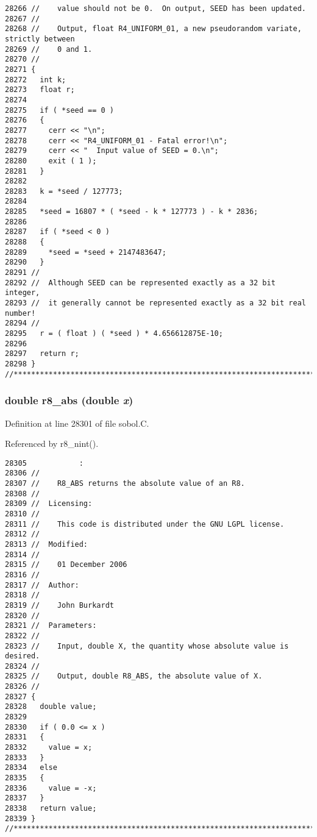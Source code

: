 \begin{Code}
\begin{verbatim}
28266 //    value should not be 0.  On output, SEED has been updated.
28267 //
28268 //    Output, float R4_UNIFORM_01, a new pseudorandom variate, strictly between
28269 //    0 and 1.
28270 //
28271 {
28272   int k;
28273   float r;
28274 
28275   if ( *seed == 0 )
28276   {
28277     cerr << "\n";
28278     cerr << "R4_UNIFORM_01 - Fatal error!\n";
28279     cerr << "  Input value of SEED = 0.\n";
28280     exit ( 1 );
28281   }
28282 
28283   k = *seed / 127773;
28284 
28285   *seed = 16807 * ( *seed - k * 127773 ) - k * 2836;
28286 
28287   if ( *seed < 0 )
28288   {
28289     *seed = *seed + 2147483647;
28290   }
28291 //
28292 //  Although SEED can be represented exactly as a 32 bit integer,
28293 //  it generally cannot be represented exactly as a 32 bit real number!
28294 //
28295   r = ( float ) ( *seed ) * 4.656612875E-10;
28296 
28297   return r;
28298 }
//****************************************************************************80
\end{verbatim}
\end{Code}


\subsubsection{\setlength{\rightskip}{0pt plus 5cm}double r8\_\-abs (double {\em x})}\label{sobol_8C_764d529be849adbbb2865d6c886710dc}




Definition at line 28301 of file sobol.C.

Referenced by r8\_\-nint().

\begin{Code}\begin{verbatim}28305            :
28306 //
28307 //    R8_ABS returns the absolute value of an R8.
28308 //
28309 //  Licensing:
28310 //
28311 //    This code is distributed under the GNU LGPL license. 
28312 //
28313 //  Modified:
28314 //
28315 //    01 December 2006
28316 //
28317 //  Author:
28318 //
28319 //    John Burkardt
28320 //
28321 //  Parameters:
28322 //
28323 //    Input, double X, the quantity whose absolute value is desired.
28324 //
28325 //    Output, double R8_ABS, the absolute value of X.
28326 //
28327 {
28328   double value;
28329 
28330   if ( 0.0 <= x )
28331   {
28332     value = x;
28333   } 
28334   else
28335   {
28336     value = -x;
28337   }
28338   return value;
28339 }
//****************************************************************************80
\end{verbatim}
\end{Code}


